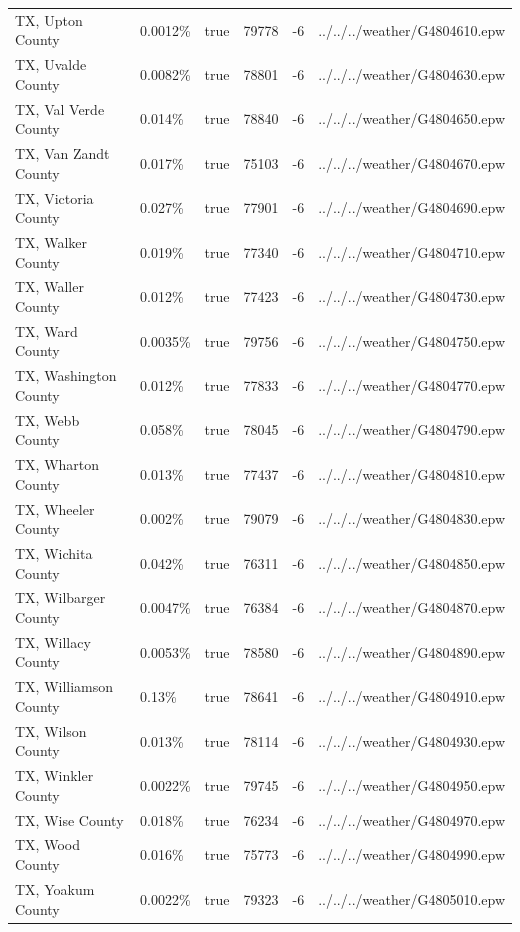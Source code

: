 \begin{longtable}[]{@{}llllll@{}}
TX, Upton County & 0.0012\% & true & 79778 & -6 &
../../../weather/G4804610.epw \\
TX, Uvalde County & 0.0082\% & true & 78801 & -6 &
../../../weather/G4804630.epw \\
TX, Val Verde County & 0.014\% & true & 78840 & -6 &
../../../weather/G4804650.epw \\
TX, Van Zandt County & 0.017\% & true & 75103 & -6 &
../../../weather/G4804670.epw \\
TX, Victoria County & 0.027\% & true & 77901 & -6 &
../../../weather/G4804690.epw \\
TX, Walker County & 0.019\% & true & 77340 & -6 &
../../../weather/G4804710.epw \\
TX, Waller County & 0.012\% & true & 77423 & -6 &
../../../weather/G4804730.epw \\
TX, Ward County & 0.0035\% & true & 79756 & -6 &
../../../weather/G4804750.epw \\
TX, Washington County & 0.012\% & true & 77833 & -6 &
../../../weather/G4804770.epw \\
TX, Webb County & 0.058\% & true & 78045 & -6 &
../../../weather/G4804790.epw \\
TX, Wharton County & 0.013\% & true & 77437 & -6 &
../../../weather/G4804810.epw \\
TX, Wheeler County & 0.002\% & true & 79079 & -6 &
../../../weather/G4804830.epw \\
TX, Wichita County & 0.042\% & true & 76311 & -6 &
../../../weather/G4804850.epw \\
TX, Wilbarger County & 0.0047\% & true & 76384 & -6 &
../../../weather/G4804870.epw \\
TX, Willacy County & 0.0053\% & true & 78580 & -6 &
../../../weather/G4804890.epw \\
TX, Williamson County & 0.13\% & true & 78641 & -6 &
../../../weather/G4804910.epw \\
TX, Wilson County & 0.013\% & true & 78114 & -6 &
../../../weather/G4804930.epw \\
TX, Winkler County & 0.0022\% & true & 79745 & -6 &
../../../weather/G4804950.epw \\
TX, Wise County & 0.018\% & true & 76234 & -6 &
../../../weather/G4804970.epw \\
TX, Wood County & 0.016\% & true & 75773 & -6 &
../../../weather/G4804990.epw \\
TX, Yoakum County & 0.0022\% & true & 79323 & -6 &
../../../weather/G4805010.epw \\

\end{longtable}
